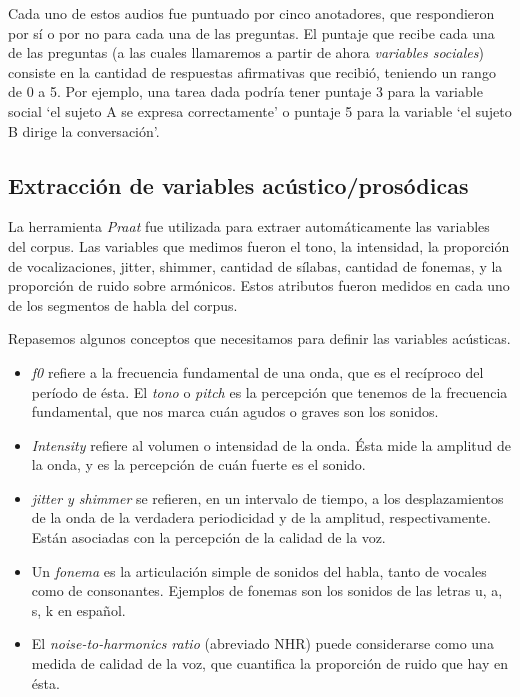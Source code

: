 \noindent Cada uno de estos audios fue puntuado por cinco anotadores, que respondieron por sí o por no para cada una de las preguntas. El puntaje que recibe cada una de las preguntas (a las cuales llamaremos a partir de ahora \emph{variables sociales}) consiste en la cantidad de respuestas afirmativas que recibió, teniendo un rango de 0 a 5. Por ejemplo, una tarea dada podría tener puntaje 3 para la variable social `el sujeto A se expresa correctamente' o puntaje 5 para la variable `el sujeto B dirige la conversación'.

\subsection{Extracción de variables acústico/prosódicas}

La herramienta \emph{Praat} fue utilizada para extraer automáticamente las variables \ap del corpus. Las variables que medimos fueron el tono, la intensidad, la proporción de vocalizaciones, jitter, shimmer, cantidad de sílabas, cantidad de fonemas, y la proporción de ruido sobre armónicos. Estos atributos fueron medidos en cada uno de los segmentos de habla del corpus.

Repasemos algunos conceptos que necesitamos para definir las variables acústicas.

\begin{itemize}
  \item \emph{f0} refiere a la frecuencia fundamental de una onda, que es el recíproco del período de ésta. El \emph{tono} o \emph{pitch} es la percepción que tenemos de la frecuencia fundamental, que nos marca cuán agudos o graves son los sonidos.
  \item \emph{Intensity} refiere al volumen o intensidad de la onda. Ésta mide la amplitud de la onda, y es la percepción de cuán fuerte es el sonido.
  \item \emph{jitter y shimmer} se refieren, en un intervalo de tiempo, a los desplazamientos de la onda de la verdadera periodicidad y de la amplitud, respectivamente. Están asociadas con la percepción de la calidad de la voz.
  \item Un \emph{fonema} es la articulación simple de sonidos del habla, tanto de vocales como de consonantes. Ejemplos de fonemas son los sonidos de las letras u, a, s, k en español.
  \item El \emph{noise-to-harmonics ratio} (abreviado NHR) puede considerarse como una medida de calidad de la voz, que cuantifica la proporción de ruido que hay en ésta.
\end{itemize}


